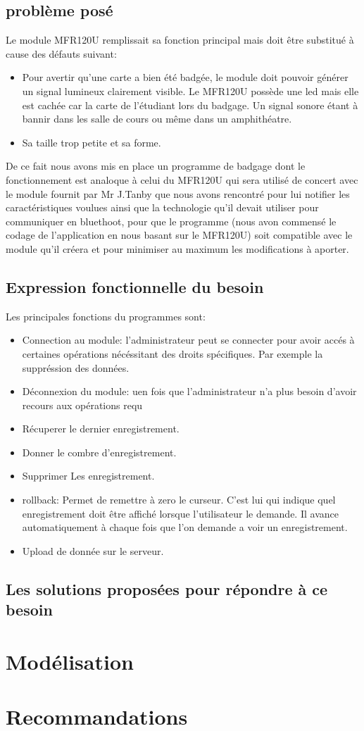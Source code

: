     \subsection{problème posé}
    Le module MFR120U remplissait sa fonction principal mais doit être substitué 
    à cause des défauts suivant:

    \begin{itemize}
    \item Pour avertir qu'une carte a bien été badgée, le module doit pouvoir générer 
    un signal lumineux clairement visible. Le MFR120U possède une led mais elle 
    est cachée car la carte de l'étudiant lors du badgage. Un signal sonore étant
    à bannir dans les salle de cours ou même dans un amphithéatre.
    \item Sa taille trop petite et sa forme.
    \end{itemize}

    De ce fait nous avons mis en place un programme de badgage dont le fonctionnement
    est analoque à celui du MFR120U qui sera utilisé de concert avec le module fournit
    par Mr J.Tanby que nous avons rencontré pour lui notifier les caractéristiques
    voulues ainsi que la technologie qu'il devait utiliser pour communiquer en 
    bluethoot, pour que le programme (nous avon commensé le codage de l'application
    en nous basant sur le MFR120U) soit compatible avec le module qu'il créera et 
    pour minimiser au maximum les modifications à aporter.


    \subsection{Expression fonctionnelle du besoin}
     Les principales fonctions du programmes sont:
    \begin{itemize}
    \item Connection au module: l'administrateur peut se connecter pour avoir accés à
     certaines opérations nécéssitant des droits spécifiques. Par exemple la 
     suppréssion des données.
    \item Déconnexion du module: uen fois que l'administrateur n'a plus besoin d'avoir 
     recours aux opérations requ 
    \item Récuperer le dernier enregistrement.
    \item Donner le combre d'enregistrement.
    \item Supprimer Les enregistrement.
    \item rollback: Permet de remettre à zero le curseur. C'est lui qui indique quel
     enregistrement doit être affiché lorsque l'utilisateur le demande. Il avance    
     automatiquement à chaque fois que l'on demande a voir un enregistrement.
    \item Upload de donnée sur le serveur.
    \end{itemize}

    \subsection{Les solutions proposées pour répondre à ce besoin}


\section{Modélisation}
\section{Recommandations}
